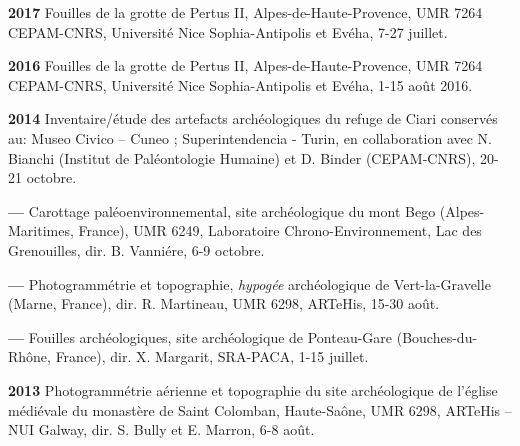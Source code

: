 \documentclass{article}
\newcommand{\fr}[1]{#1}       %
\newcommand{\en}[1]{}     %
\begin{document}
\smallbreak
\textbf{2017}
\fr{Fouilles de la grotte de Pertus II, Alpes-de-Haute-Provence, UMR 7264 CEPAM-CNRS, Université Nice Sophia-Antipolis et Evéha, 7-27 juillet.}
\en{Excavations at the Pertus II cave, Alpes-de-Haute-Provence, UMR 7264 CEPAM-CNRS, University of Nice Sophia-Antipolis and Evéha, July 7-27.}

\smallbreak
\textbf{2016}
\fr{Fouilles de la grotte de Pertus II, Alpes-de-Haute-Provence, UMR 7264 CEPAM-CNRS, Université Nice Sophia-Antipolis et Evéha, 1-15 août 2016.}
\en{Excavations at the Pertus II cave, Alpes-de-Haute-Provence, UMR 7264 CEPAM-CNRS, University of Nice Sophia-Antipolis and Evéha, August 1-15, 2016.}

\smallbreak
\textbf{2014}
\fr{Inventaire/étude des artefacts archéologiques du refuge de Ciari conservés au: Museo Civico -- Cuneo ; Superintendencia - Turin, en collaboration avec N. Bianchi (Institut de Paléontologie Humaine) et D. Binder (CEPAM-CNRS), 20-21 octobre.}
\en{Inventory/study of archaeological artifacts from the Ciari refuge stored at: Museo Civico -- Cuneo; Superintendencia - Turin, in collaboration with N. Bianchi (Institute of Human Paleontology) and D. Binder (CEPAM-CNRS), October 20-21.}

\smallbreak
\textbf{--- }
\fr{Carottage paléoenvironnemental, site archéologique du mont Bego (Alpes-Maritimes, France), UMR 6249, Laboratoire Chrono-Environnement, Lac des Grenouilles, dir. B. Vanniére, 6-9 octobre.}
\en{Paleoenvironmental coring, archaeological site of Mont Bego (Alpes-Maritimes, France), UMR 6249, Laboratory of Chrono-Environment, Lac des Grenouilles, directed by B. Vanniére, October 6-9.}

\smallbreak
\textbf{--- }
\fr{Photogrammétrie et topographie, \textit{hypogée} archéologique de Vert-la-Gravelle (Marne, France), dir. R. Martineau, UMR 6298, ARTeHis, 15-30 août.}
\en{Photogrammetry and topography, archaeological \textit{hypogeum} of Vert-la-Gravelle (Marne, France), directed by R. Martineau, UMR 6298, ARTeHis, August 15-30.}

\smallbreak
\textbf{---}
\fr{Fouilles archéologiques, site archéologique de Ponteau-Gare (Bouches-du-Rhône, France), dir. X. Margarit, SRA-PACA, 1-15 juillet.}
\en{Archaeological excavations, archaeological site of Ponteau-Gare (Bouches-du-Rhône, France), directed by X. Margarit, SRA-PACA, July 1-15.}

\smallbreak
\textbf{2013}
\fr{Photogrammétrie aérienne et topographie du site archéologique de l'église médiévale du monastère de Saint Colomban, Haute-Saône, UMR 6298, ARTeHis -- NUI Galway, dir. S. Bully et E. Marron, 6-8 août.}
\en{Aerial photogrammetry and topography of the archaeological site of the medieval church of Saint Colomban Monastery, Haute-Saône, UMR 6298, ARTeHis -- NUI Galway, directed by S. Bully and E. Marron, August 6-8.}
\end{document}
